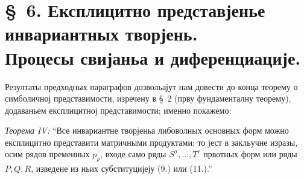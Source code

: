 \documentclass[11pt]{article}
\begin{document}
\section*{\S\ 6. Експлицитно представјенье инвариантных творјень.\\Процесы свијаньа и диференциације.}

Резултаты предходных параграфов дозвольајут нам довести до конца теорему о симболичној представимости, изречену в \S\ 2 (прву фундаменталну теорему), додаваньем експлицитној представимости; именно покажемо:

\emph{Теорема IV:} ``Все инвариантне творјеньа либоволных основных форм можно експлицитно представити матричными продуктами; то јест в закльучне изразы, осим рядов пременных $p_\rho$, входе само ряды $S^\sigma,\ldots,T^\tau$ првотных форм или ряды $P,Q,R$, изведене из ньих субституцијеју (9.) или (11.).''
\end{document}

